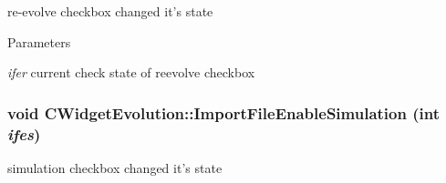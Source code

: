 \label{classCWidgetEvolution_a85d018ad28c22f7b20ecefa82b282313}
re-\/evolve checkbox changed it's state


\begin{DoxyParams}{Parameters}
\item[{\em ifer}]current check state of reevolve checkbox \end{DoxyParams}
\hypertarget{classCWidgetEvolution_ab404024a3c67b19e74448fc61a96c1af}{
\subsubsection[{ImportFileEnableSimulation}]{\setlength{\rightskip}{0pt plus 5cm}void CWidgetEvolution::ImportFileEnableSimulation (int {\em ifes})}}
\label{classCWidgetEvolution_ab404024a3c67b19e74448fc61a96c1af}
simulation checkbox changed it's state


